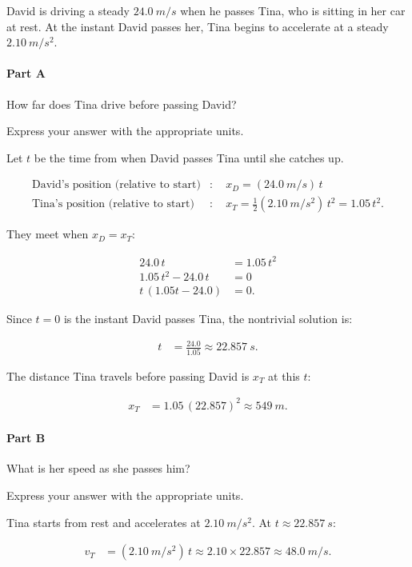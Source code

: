 David is driving a steady \(\SI{24.0}{m/s}\) when he passes Tina, who is sitting in her car at rest. At the instant David passes her, Tina begins to accelerate at a steady \(\SI{2.10}{m/s^2}\).

\paragraph{Part A}
How far does Tina drive before passing David?

Express your answer with the appropriate units.

\begin{solution}
	Let \( t \) be the time from when David passes Tina until she catches up.

	\begin{align*}
		\text{David's position (relative to start)} &:\quad x_D = (\SI{24.0}{m/s})\,t \\
		\text{Tina's position (relative to start)} &:\quad x_T = \frac{1}{2}(\SI{2.10}{m/s^2})\,t^2 = 1.05\,t^2.
	\end{align*}

	They meet when \( x_D = x_T \):

	\begin{align*}
		24.0\,t &= 1.05\,t^2 \\
		1.05\,t^2 - 24.0\,t &= 0 \\
		t\,(1.05t - 24.0) &= 0.
	\end{align*}

	Since \( t = 0 \) is the instant David passes Tina, the nontrivial solution is:

	\begin{align*}
		t &= \frac{24.0}{1.05} \approx \SI{22.857}{s}.
	\end{align*}

	The distance Tina travels before passing David is \( x_T \) at this \( t \):

	\begin{align*}
		x_T &= 1.05\,(22.857)^2 \approx \SI{549}{m}.
	\end{align*}
\end{solution}

\paragraph{Part B}
What is her speed as she passes him?

Express your answer with the appropriate units.

\begin{solution}
	Tina starts from rest and accelerates at \( \SI{2.10}{m/s^2} \). At \( t \approx \SI{22.857}{s} \):

	\begin{align*}
		v_T &= (\SI{2.10}{m/s^2})\,t \approx 2.10 \times 22.857 \approx \SI{48.0}{m/s}.
	\end{align*}
\end{solution}

